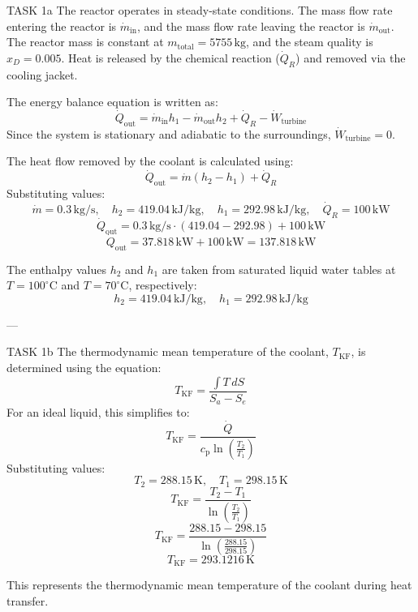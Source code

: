 TASK 1a  
The reactor operates in steady-state conditions. The mass flow rate entering the reactor is \( \dot{m}_{\text{in}} \), and the mass flow rate leaving the reactor is \( \dot{m}_{\text{out}} \). The reactor mass is constant at \( m_{\text{total}} = 5755 \, \text{kg} \), and the steam quality is \( x_D = 0.005 \). Heat is released by the chemical reaction (\( \dot{Q}_R \)) and removed via the cooling jacket.  

The energy balance equation is written as:  
\[
\dot{Q}_{\text{out}} = \dot{m}_{\text{in}} h_1 - \dot{m}_{\text{out}} h_2 + \dot{Q}_R - \dot{W}_{\text{turbine}}
\]  
Since the system is stationary and adiabatic to the surroundings, \( \dot{W}_{\text{turbine}} = 0 \).  

The heat flow removed by the coolant is calculated using:  
\[
\dot{Q}_{\text{out}} = \dot{m} (h_2 - h_1) + \dot{Q}_R
\]  
Substituting values:  
\[
\dot{m} = 0.3 \, \text{kg/s}, \quad h_2 = 419.04 \, \text{kJ/kg}, \quad h_1 = 292.98 \, \text{kJ/kg}, \quad \dot{Q}_R = 100 \, \text{kW}
\]  
\[
\dot{Q}_{\text{out}} = 0.3 \, \text{kg/s} \cdot (419.04 - 292.98) + 100 \, \text{kW}
\]  
\[
\dot{Q}_{\text{out}} = 37.818 \, \text{kW} + 100 \, \text{kW} = 137.818 \, \text{kW}
\]  

The enthalpy values \( h_2 \) and \( h_1 \) are taken from saturated liquid water tables at \( T = 100^\circ\text{C} \) and \( T = 70^\circ\text{C} \), respectively:  
\[
h_2 = 419.04 \, \text{kJ/kg}, \quad h_1 = 292.98 \, \text{kJ/kg}
\]  

---

TASK 1b  
The thermodynamic mean temperature of the coolant, \( T_{\text{KF}} \), is determined using the equation:  
\[
T_{\text{KF}} = \frac{\int T \, dS}{S_a - S_e}
\]  
For an ideal liquid, this simplifies to:  
\[
T_{\text{KF}} = \frac{\dot{Q}}{c_{\text{p}} \ln \left( \frac{T_2}{T_1} \right)}
\]  
Substituting values:  
\[
T_2 = 288.15 \, \text{K}, \quad T_1 = 298.15 \, \text{K}
\]  
\[
T_{\text{KF}} = \frac{T_2 - T_1}{\ln \left( \frac{T_2}{T_1} \right)}
\]  
\[
T_{\text{KF}} = \frac{288.15 - 298.15}{\ln \left( \frac{288.15}{298.15} \right)}
\]  
\[
T_{\text{KF}} = 293.1216 \, \text{K}
\]  

This represents the thermodynamic mean temperature of the coolant during heat transfer.